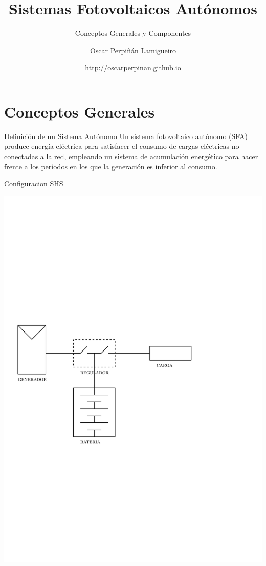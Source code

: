 \documentclass[xcolor={usenames,svgnames,dvipsnames}]{beamer}
\author{Oscar Perpiñán Lamigueiro}
\date{\url{http://oscarperpinan.github.io}}
\title{Sistemas Fotovoltaicos Autónomos}
\subtitle{Conceptos Generales y Componentes}
\begin{document}
\maketitle

\section{Conceptos Generales}
\label{sec:orgbf4fa2b}

\begin{frame}[label={sec:org7e8b8a6}]{Definición de un Sistema Autónomo}
Un sistema fotovoltaico autónomo (SFA) produce energía eléctrica para \alert{satisfacer el consumo de cargas eléctricas no conectadas a la red}, \alert{empleando un sistema de acumulación energético} para hacer frente a los períodos en los que la generación es inferior al consumo.
\end{frame}

\begin{frame}[label={sec:org1fa1815}]{Configuracion SHS}
\begin{center}
\includegraphics[width=.9\linewidth]{../figs/DiagramaUnifilarER_DC.pdf}
\end{center}
\end{frame}
\end{document}
